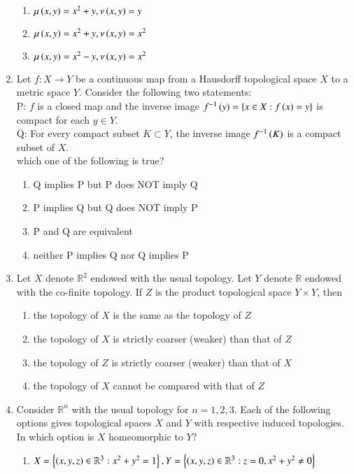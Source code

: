 \documentclass[journal]{IEEEtran}
\begin{document}
\begin{enumerate}
\begin{enumerate}
    \item $\mu\left(x,y\right)=x^2+y,\nu\left(x,y\right)=y$
    \item $\mu\left(x,y\right)=x^2+y,\nu\left(x,y\right)=x^2$
    \item $\mu\left(x,y\right)=x^2-y,\nu\left(x,y\right)=x^2$
\end{enumerate}
\item Let $f : X\rightarrow Y$ be a continuous map from a Hausdorff topological space $X$ to a metric space $Y$. Consider the following two statements:\\
  P: $f$ is a closed map and the inverse image $f^{-1}\left(y\right)=\left\{x\in X : f\left(x\right)=y\right\} $ is compact for each $y \in Y$.\\
  Q: For every compact subset $K \subset Y$, the inverse image $f^{-1}\left(K\right)$ is a compact subset of $X$.\\which one of the following is true?
  \begin{enumerate}
      \item Q implies P but P does NOT imply Q
      \item P implies Q but Q does NOT imply P
      \item P and Q are equivalent
      \item neither P implies Q nor Q implies P
  \end{enumerate}
\item Let $X$ denote $\mathbb{R}^2$ endowed with the usual topology. Let $Y$ denote $\mathbb{R}$ endowed with the co-finite topology. If $Z$ is the product topological space $Y\times Y$, then 
\begin{enumerate}
    \item the topology of $X$ is the same as the topology of $Z$
    \item the topology of $X$ is strictly coarser (weaker) than that of $Z$
    \item the topology of $Z$ is strictly coarser (weaker) than that of $X$
    \item the topology of $X$ cannot be compared with that of $Z$
\end{enumerate}
\item Consider $\mathbb{R}^n$ with the usual topology for $n=1,2,3$. Each of the following options gives topological spaces $X$ and $Y$ with respective induced topologies. In which option is $X$ homeomorphic to $Y$?
\begin{enumerate}
	\item $X=\left\{\left(x,y,z\right)\in \mathbb{R}^3 : x^2+y^2=1\right\},Y=\left\{\left(x,y,z\right)\in \mathbb{R}^3 : z=0, x^2+y^2 \neq 0\right\}$

\end{enumerate}
\end{enumerate}
\end{document}
